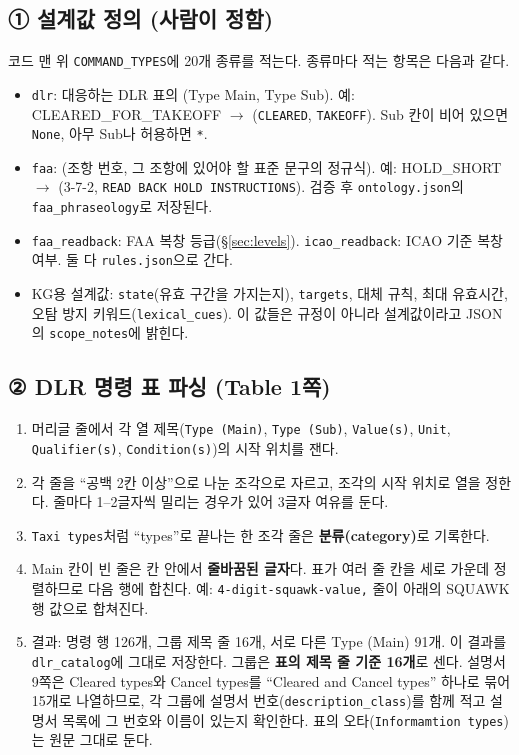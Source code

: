 \documentclass[10pt,a4paper]{article}
\newcommand{\cmd}[1]{\textsf{\small #1}}
\newcommand{\key}[1]{\texttt{\small #1}}
\begin{document}
\subsection{① 설계값 정의 (사람이 정함)}
코드 맨 위 \key{COMMAND\_TYPES}에 20개 종류를 적는다. 종류마다 적는 항목은 다음과 같다.
\begin{itemize}[leftmargin=14pt]
\item \key{dlr}: 대응하는 DLR 표의 (Type Main, Type Sub). 예: \cmd{CLEARED\_FOR\_TAKEOFF} $\to$ (\texttt{CLEARED}, \texttt{TAKEOFF}). Sub 칸이 비어 있으면 \texttt{None}, 아무 Sub나 허용하면 \texttt{*}.
\item \key{faa}: (조항 번호, 그 조항에 있어야 할 표준 문구의 정규식). 예: \cmd{HOLD\_SHORT} $\to$ (3-7-2, \texttt{READ BACK HOLD INSTRUCTIONS}). 검증 후 \texttt{ontology.json}의 \key{faa\_phraseology}로 저장된다.
\item \key{faa\_readback}: FAA 복창 등급(\S\ref{sec:levels}). \key{icao\_readback}: ICAO 기준 복창 여부. 둘 다 \texttt{rules.json}으로 간다.
\item KG용 설계값: \key{state}(유효 구간을 가지는지), \key{targets}, 대체 규칙, 최대 유효시간, 오탐 방지 키워드(\key{lexical\_cues}). 이 값들은 규정이 아니라 설계값이라고 JSON의 \key{scope\_notes}에 밝힌다.
\end{itemize}

\subsection{② DLR 명령 표 파싱 (Table 1쪽)}
\begin{enumerate}[leftmargin=14pt]
\item 머리글 줄에서 각 열 제목(\texttt{Type (Main)}, \texttt{Type (Sub)}, \texttt{Value(s)}, \texttt{Unit}, \texttt{Qualifier(s)}, \texttt{Condition(s)})의 시작 위치를 잰다.
\item 각 줄을 ``공백 2칸 이상''으로 나눈 조각으로 자르고, 조각의 시작 위치로 열을 정한다. 줄마다 1--2글자씩 밀리는 경우가 있어 3글자 여유를 둔다.
\item \texttt{Taxi types}처럼 ``types''로 끝나는 한 조각 줄은 \textbf{분류(category)}로 기록한다.
\item Main 칸이 빈 줄은 칸 안에서 \textbf{줄바꿈된 글자}다. 표가 여러 줄 칸을 세로 가운데 정렬하므로 다음 행에 합친다. 예: \texttt{4-digit-squawk-value,} 줄이 아래의 \cmd{SQUAWK} 행 값으로 합쳐진다.
\item 결과: 명령 행 126개, 그룹 제목 줄 16개, 서로 다른 Type (Main) 91개. 이 결과를 \key{dlr\_catalog}에 그대로 저장한다. 그룹은 \textbf{표의 제목 줄 기준 16개}로 센다. 설명서 9쪽은 Cleared types와 Cancel types를 ``Cleared and Cancel types'' 하나로 묶어 15개로 나열하므로, 각 그룹에 설명서 번호(\key{description\_class})를 함께 적고 설명서 목록에 그 번호와 이름이 있는지 확인한다. 표의 오타(\texttt{Informamtion types})는 원문 그대로 둔다.
\end{enumerate}
\end{document}
